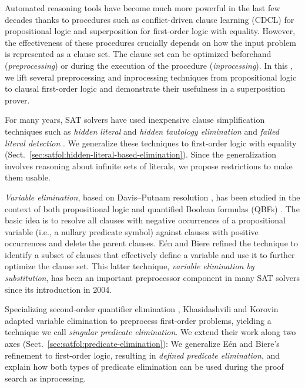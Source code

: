 Automated reasoning tools have become much more powerful in the last few
decades thanks to procedures such as conflict-driven clause learning (CDCL)
\cite{MSLM09HBSAT} for propositional logic and superposition
\cite{bg-94-superposition} for first-order logic with equality. However,
the effectiveness of these procedures crucially depends on how the input
problem is represented as a clause set. The clause set
can be optimized beforehand (\emph{preprocessing}) or during the execution of
the procedure (\emph{inprocessing}). In this \paper, we lift several preprocessing and
inprocessing techniques from propositional logic to clausal first-order logic
and demonstrate their usefulness in a superposition prover.

For many years, SAT solvers have used inexpensive clause simplification
techniques such as \emph{hidden literal} and \emph{hidden tautology elimination}
\cite{hjb-2010-cl-elim,hjb-2011-big-simplification} and \emph{failed literal
detection} \cite[Sect.~1.6]{jwf-1995-fld}. We generalize these techniques to
first-order logic with equality
(Sect.~\ref{sec:satfol:hidden-literal-based-elimination}). Since the generalization
involves reasoning about infinite sets of literals, we propose restrictions to
make them usable.

\emph{Variable elimination}, based on Davis--Putnam resolution \cite{dp-60-dp}, has
been studied in the context of both propositional logic
\cite{sp-04-niver,cs-00-zres} and quantified Boolean formulas (QBFs)
\cite{ab-2004-re}. The basic idea is to resolve all clauses with negative
occurrences of a propositional variable (i.e., a nullary predicate symbol) against
clauses with positive occurrences and delete the parent clauses. E\'en and
Biere \cite{eb-2005-satpreprocess} refined the technique to identify a subset
of clauses that effectively define a variable and use it to further optimize the
clause set. This latter technique, \emph{variable elimination by substitution},
has been an important preprocessor component in many SAT solvers since its
introduction in 2004.

\begin{sloppypar}
    Specializing second-order quantifier elimination
    \cite{go-1992-so-pred-elim,hjo-1996-scan}, Khasidashvili and Korovin~\cite{kk-2016-pe-fol} adapted variable elimination to preprocess first-order
    problems, yielding a technique we call \emph{singular predicate elimination}. We
    extend their work along two axes (Sect.~\ref{sec:satfol:predicate-elimination}): We
    generalize E\'en and Biere's refinement to first-order logic, resulting in
    \emph{defined predicate elimination}, and explain how both types of predicate
    elimination can be used during the proof search as inprocessing.    
\end{sloppypar}

